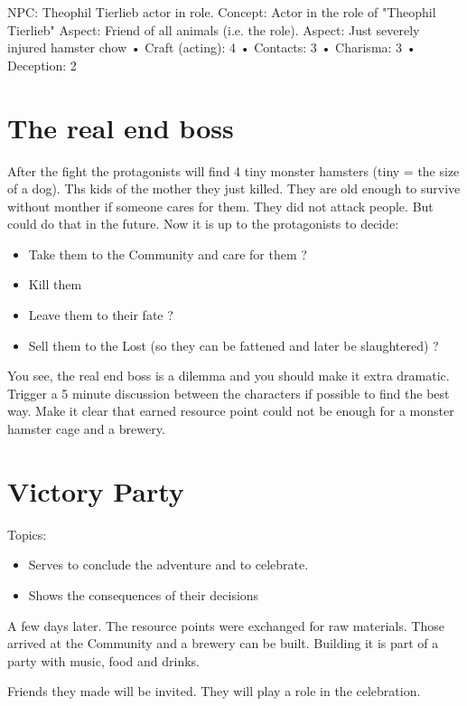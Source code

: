 


NPC: Theophil Tierlieb
actor in role.
Concept: Actor in the role of "Theophil Tierlieb"
Aspect: Friend of all animals (i.e. the role).
Aspect: Just severely injured hamster chow
• Craft (acting): 4
• Contacts: 3
• Charisma: 3
• Deception: 2

\section{The real end boss}

After the fight the protagonists will find 4 tiny monster hamsters (tiny = the size of a dog). Ths kids of the mother they just killed. They are old enough to survive without monther if someone cares for them. They did not attack people. But could do that in the future. Now it is up to the protagonists to decide:

\begin{itemize}
    \item Take them to the Community and care for them ?
    \item Kill them
    \item Leave them to their fate ?
    \item Sell them to the Lost (so they can be fattened and later be slaughtered) ?
\end{itemize}

You see, the real end boss is a dilemma and you should make it extra dramatic. Trigger a 5 minute discussion between the characters if possible to find the best way. Make it clear that earned resource point could not be enough for a monster hamster cage and a brewery.

\section{Victory Party}

Topics:

\begin{itemize}
\item Serves to conclude the adventure and to celebrate.
\item Shows the consequences of their decisions
\end{itemize}

A few days later. The resource points were exchanged for raw materials. Those arrived at the Community and a brewery can be built. Building it is part of a party with music, food and drinks.

Friends they made will be invited. They will play a role in the celebration.

